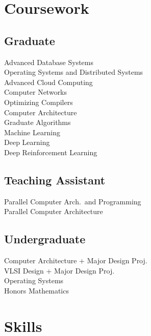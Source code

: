 \documentclass[]{resume}
\begin{document}
\begin{minipage}[t]{0.377\textwidth}

\section{Coursework}
\subsection{Graduate}
Advanced Database Systems \\
Operating Systems and Distributed Systems \\
Advanced Cloud Computing \\
Computer Networks \\
Optimizing Compilers \\
Computer Architecture \\
Graduate Algorithms \\
Machine Learning \\
Deep Learning \\
Deep Reinforcement Learning \\

\sectionsep%
\subsection{Teaching Assistant}
Parallel Computer Arch.\ and Programming \\
Parallel Computer Architecture
\sectionsep%

\subsection{Undergraduate}
Computer Architecture + Major Design Proj. \\
VLSI Design + Major Design Proj. \\
Operating Systems \\
Honors Mathematics


\section{Skills}

\end{minipage}
\end{document}
